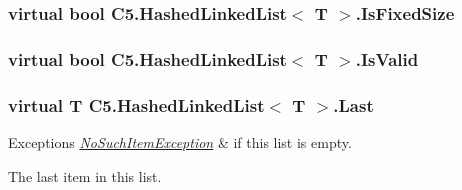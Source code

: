 \subsubsection[{Is\+Fixed\+Size}]{\setlength{\rightskip}{0pt plus 5cm}virtual bool {\bf C5.\+Hashed\+Linked\+List}$<$ T $>$.Is\+Fixed\+Size\hspace{0.3cm}{\ttfamily [get]}}\label{class_c5_1_1_hashed_linked_list_ae5328883cfc6d4f3415635f4fd2fb0fc}




\hypertarget{class_c5_1_1_hashed_linked_list_a548a9179889fa5600ad6cea96b341893}{}
\subsubsection[{Is\+Valid}]{\setlength{\rightskip}{0pt plus 5cm}virtual bool {\bf C5.\+Hashed\+Linked\+List}$<$ T $>$.Is\+Valid\hspace{0.3cm}{\ttfamily [get]}}\label{class_c5_1_1_hashed_linked_list_a548a9179889fa5600ad6cea96b341893}




\hypertarget{class_c5_1_1_hashed_linked_list_ab47e317103cce4499a55bac8b1aac351}{}
\subsubsection[{Last}]{\setlength{\rightskip}{0pt plus 5cm}virtual T {\bf C5.\+Hashed\+Linked\+List}$<$ T $>$.Last\hspace{0.3cm}{\ttfamily [get]}}\label{class_c5_1_1_hashed_linked_list_ab47e317103cce4499a55bac8b1aac351}





\begin{DoxyExceptions}{Exceptions}
{\em \hyperlink{class_c5_1_1_no_such_item_exception}{No\+Such\+Item\+Exception}} & if this list is empty.\\
\hline
\end{DoxyExceptions}


The last item in this list.\hypertarget{class_c5_1_1_hashed_linked_list_a2eab2146c49daf255c542b957656b25c}{}
